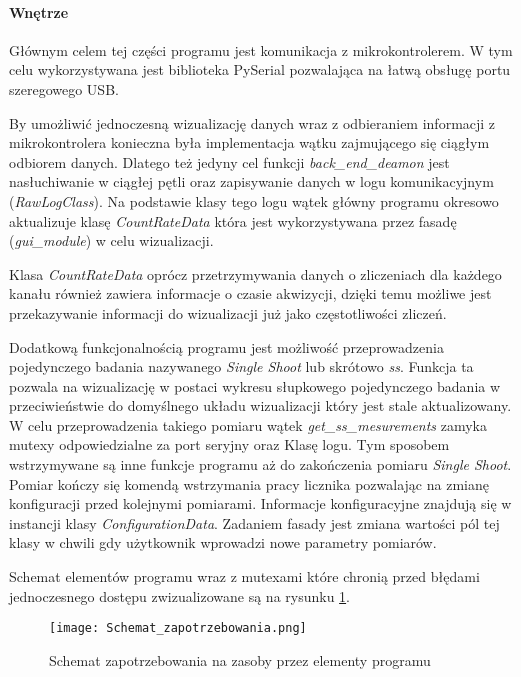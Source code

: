 \paragraph{Wnętrze}

Głównym celem tej części programu jest komunikacja z mikrokontrolerem. 
W tym celu wykorzystywana jest biblioteka PySerial\cite{pyserial} pozwalająca na łatwą obsługę portu szeregowego USB. 

By umożliwić jednoczesną wizualizację danych wraz z odbieraniem informacji z mikrokontrolera konieczna była implementacja wątku zajmującego się ciągłym odbiorem danych. 
Dlatego też jedyny cel funkcji \textit{back\_end\_deamon} jest nasłuchiwanie w ciągłej pętli oraz zapisywanie danych w logu komunikacyjnym (\textit{RawLogClass}). 
Na podstawie klasy tego logu wątek główny programu okresowo aktualizuje klasę \textit{CountRateData} która jest wykorzystywana przez fasadę (\textit{gui\_module}) w celu wizualizacji. 

Klasa \textit{CountRateData} oprócz przetrzymywania danych o zliczeniach dla każdego kanału również zawiera informacje o czasie akwizycji, dzięki temu możliwe jest przekazywanie informacji do wizualizacji już jako częstotliwości zliczeń. 

Dodatkową funkcjonalnością programu jest możliwość przeprowadzenia pojedynczego badania nazywanego \textit{Single Shoot} lub skrótowo \textit{ss}.
Funkcja ta pozwala na wizualizację w postaci wykresu słupkowego pojedynczego badania w przeciwieństwie do domyślnego układu wizualizacji który jest stale aktualizowany. 
W celu przeprowadzenia takiego pomiaru wątek \textit{get\_ss\_mesurements} zamyka mutexy odpowiedzialne za port seryjny oraz Klasę logu. 
Tym sposobem wstrzymywane są inne funkcje programu aż do zakończenia pomiaru \textit{Single Shoot}.
Pomiar kończy się komendą wstrzymania pracy licznika pozwalając na zmianę konfiguracji przed kolejnymi pomiarami. Informacje konfiguracyjne znajdują się w instancji klasy \textit{ConfigurationData}. Zadaniem fasady jest zmiana wartości pól tej klasy w chwili gdy użytkownik wprowadzi nowe parametry pomiarów. 

Schemat elementów programu wraz z mutexami które chronią przed błędami jednoczesnego dostępu zwizualizowane są na rysunku \ref{program zapotrzebowanie}.
\begin{figure}
        \centering
        \texttt{[image: Schemat\_zapotrzebowania.png]}
        \caption{Schemat zapotrzebowania na zasoby przez elementy programu}
        \label{program zapotrzebowanie}
\end{figure}


